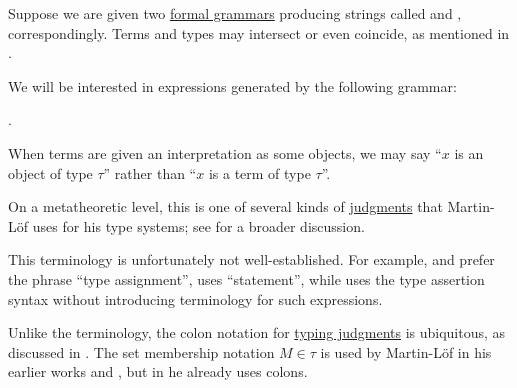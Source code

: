\begin{definition}\label{def:type_assertion}\mimprovised
  Suppose we are given two \hyperref[def:formal_grammar/schema]{formal grammars} producing strings called  and , correspondingly. Terms and types may intersect or even coincide, as mentioned in .

  We will be interested in expressions generated by the following grammar:
  \begin{bnf*}
     { \bnfsp \bnftsq{\( : \)} \bnfsp {}}.
  \end{bnf*}
\end{definition}
\begin{comments}
  \item When terms are given an interpretation as some objects, we may say \enquote{\( x \) is an object of type \( \tau \)} rather than \enquote{\( x \) is a term of type \( \tau \)}.

  \item On a metatheoretic level, this is one of several kinds of \hyperref[con:judgment]{judgments} that Martin-L\"of uses for his type systems; see  for a broader discussion.

  \item This terminology is unfortunately not well-established. For example,  and  prefer the phrase \enquote{type assignment},  uses \enquote{statement}, while  uses the type assertion syntax without introducing terminology for such expressions.

  \item Unlike the terminology, the colon notation for \hyperref[rem:typing_judgments]{typing judgments} is ubiquitous, as discussed in \cite{MathSE:origin_of_colon_notation_for_type_assertions}. The set membership notation \( M \in \tau \) is used by Martin-L\"of in his earlier works \cite{MartinLöf1975IntTypeTheory} and \cite{MartinLöf1984IntTypeTheory}, but in \cite{MartinLöf1994TypeJudgments} he already uses colons.
\end{comments}

